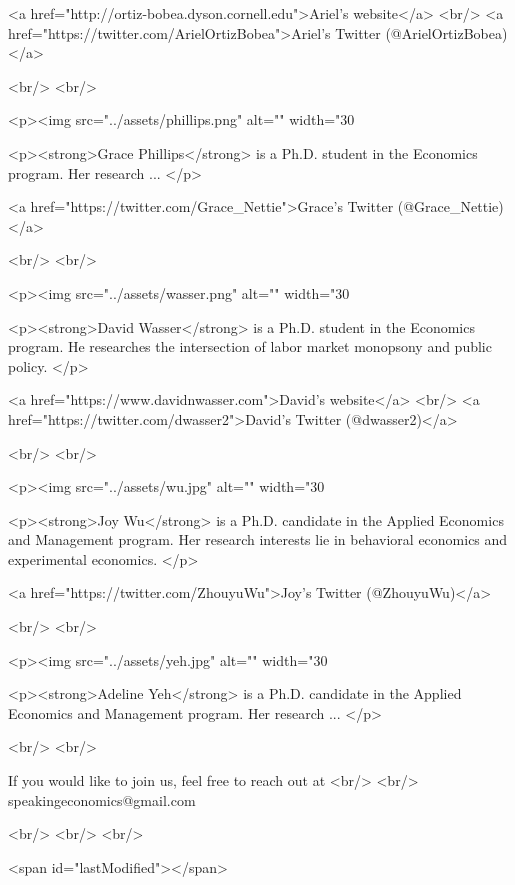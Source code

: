 <a href="http://ortiz-bobea.dyson.cornell.edu">Ariel's website</a>
<br/>
<a href="https://twitter.com/ArielOrtizBobea">Ariel's Twitter (@ArielOrtizBobea)</a> 

<br/>
<br/>

<p><img src="../assets/phillips.png" alt="" width="30%

<p><strong>Grace Phillips</strong> is a Ph.D. student in the Economics program. Her research ... </p>

<a href="https://twitter.com/Grace_Nettie">Grace's Twitter (@Grace_Nettie)</a>

<br/>
<br/>

<p><img src="../assets/wasser.png" alt="" width="30%

<p><strong>David Wasser</strong> is a Ph.D. student in the Economics program. He researches the intersection of labor market monopsony and public policy. </p>

<a href="https://www.davidnwasser.com">David's website</a>
<br/>
<a href="https://twitter.com/dwasser2">David's Twitter (@dwasser2)</a>

<br/>
<br/>

<p><img src="../assets/wu.jpg" alt="" width="30%

<p><strong>Joy Wu</strong> is a Ph.D. candidate in the Applied Economics and Management program. Her research interests lie in behavioral economics and experimental economics. </p>

<a href="https://twitter.com/ZhouyuWu">Joy's Twitter (@ZhouyuWu)</a>

<br/>
<br/>

<p><img src="../assets/yeh.jpg" alt="" width="30%

<p><strong>Adeline Yeh</strong> is a Ph.D. candidate in the Applied Economics and Management program. Her research ... </p>


<br/>
<br/>

    
    If you would like to join us, feel free to reach out at
    <br/>
    <br/>
    speakingeconomics@gmail.com

 

<br/>
<br/>
<br/>

     
  <span id="lastModified"></span>
